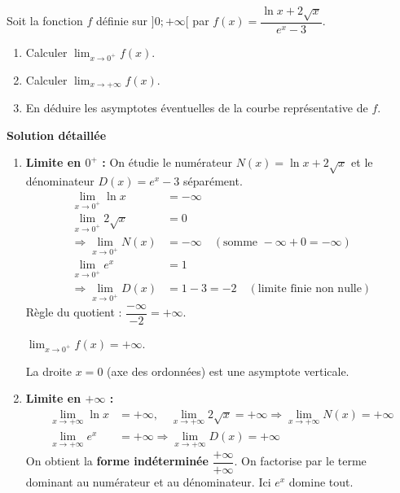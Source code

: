 \documentclass[11pt]{article}
\begin{document}
\begin{exoresolu}
    Soit la fonction $f$ définie sur $]0; +\infty[$ par $f(x) = \dfrac{\ln x + 2\sqrt{x}}{e^x - 3}$.
    \begin{enumerate}
        \item Calculer $\lim_{x\to 0^+} f(x)$.
        \item Calculer $\lim_{x\to +\infty} f(x)$.
        \item En déduire les asymptotes éventuelles de la courbe représentative de $f$.
    \end{enumerate}
    \tcblower
    \textbf{Solution détaillée}
    \begin{enumerate}
        \item \textbf{Limite en $0^+$ :}
              On étudie le numérateur $N(x) = \ln x + 2\sqrt{x}$ et le dénominateur $D(x) = e^x - 3$ séparément.
              \begin{align*}
                  \lim_{x\to 0^+} \ln x &= -\infty \\
                  \lim_{x\to 0^+} 2\sqrt{x} &= 0 \\
                  \Rightarrow \lim_{x\to 0^+} N(x) &= -\infty \quad (\text{somme } -\infty + 0 = -\infty) \\[0.5em]
                  \lim_{x\to 0^+} e^x &= 1 \\
                  \Rightarrow \lim_{x\to 0^+} D(x) &= 1 - 3 = -2 \quad (\text{limite finie non nulle})
              \end{align*}
              Règle du quotient : $\dfrac{-\infty}{-2} = +\infty$.
              \begin{aretenir}
                  $\lim_{x\to 0^+} f(x) = +\infty$.
              \end{aretenir}
              La droite $x=0$ (axe des ordonnées) est une asymptote verticale.
        \item \textbf{Limite en $+\infty$ :}
              \begin{align*}
                  \lim_{x\to +\infty} \ln x &= +\infty, \quad \lim_{x\to +\infty} 2\sqrt{x} = +\infty \Rightarrow \lim_{x\to +\infty} N(x) = +\infty \\
                  \lim_{x\to +\infty} e^x &= +\infty \Rightarrow \lim_{x\to +\infty} D(x) = +\infty
              \end{align*}
              On obtient la \textbf{forme indéterminée} $\dfrac{+\infty}{+\infty}$.
              On factorise par le terme dominant au numérateur et au dénominateur. Ici $e^x$ domine tout.

\end{enumerate}
\end{exoresolu}
\end{document}
